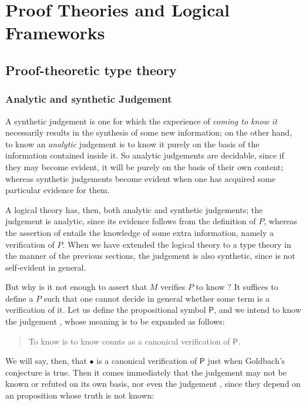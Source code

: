 \documentclass[main.tex]{subfiles}
\begin{document}
\onehalfspacing

\chapter{Proof Theories and Logical Frameworks}

\section{Proof-theoretic type theory}

\subsection{Analytic and synthetic Judgement}

A synthetic judgement is one for which the experience of \emph{coming to know
it} necessarily results in the synthesis of some new information; on the other
hand, to know an \emph{analytic} judgement is to know it purely on the basis of
the information contained inside it. So analytic judgements are decidable,
since if they may become evident, it will be purely on the basis of their own
content; whereas synthetic judgements become evident when one has acquired some
particular evidence for them.

A logical theory has, then, both analytic and synthetic judgements; the
judgement  is analytic, since its evidence follows from the
definition of $P$, whereas the assertion of  entails the knowledge of
some extra information, namely a verification of $P$. When we have extended the
logical theory to a type theory in the manner of the previous sections, the
judgement  is also synthetic, since  is not self-evident in
general.

But why is it not enough to assert that $M$ verifies $P$ to know ? It
suffices to define a $P$ such that one cannot decide in general whether some
term is a verification of it. Let us define the propositional symbol
$\mathsf{P}$, and we intend to know the judgement , whose
meaning is to be expanded as follows:
\begin{quote}
  To know  is to know counts as a canonical verification of $\mathsf{P}$.
\end{quote}

We will say, then, that $\bullet$ is a canonical verification of $\mathsf{P}$
just when Goldbach's conjecture is true. Then it comes immediately that the
judgement  may not be known or refuted on its own basis, nor
even the judgement , since they depend on an
proposition whose truth is not known:
\end{document}
